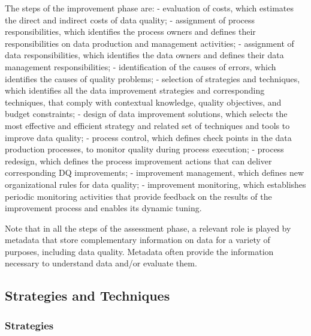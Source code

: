 \documentclass[pdftex,english,oribibl]{llncs}
\begin{document}
    The steps of the improvement phase are:
    - evaluation of costs, which estimates the direct and indirect costs of data quality;
    - assignment of process responsibilities, which identifies the process owners and defines their responsibilities on data production and management activities;
    - assignment of data responsibilities, which identifies the data owners and defines their data management responsibilities;
    - identification of the causes of errors, which identifies the causes of quality problems;
    - selection of strategies and techniques, which identifies all the data improvement strategies and corresponding techniques, that comply with contextual knowledge, quality objectives, and budget constraints;
    - design of data improvement solutions, which selects the most effective and efficient strategy and related set of techniques and tools to improve data quality;
    - process control, which defines check points in the data production processes, to monitor quality during process execution;
    - process redesign, which defines the process improvement actions that can deliver corresponding DQ improvements;
    - improvement management, which defines new organizational rules for data quality;
    - improvement monitoring, which establishes periodic monitoring activities that provide feedback on the results of the improvement process and enables its dynamic tuning.

    Note that in all the steps of the assessment phase, a relevant role is played by metadata that store complementary information on data for a variety of purposes, including data quality. Metadata often provide the information necessary to understand data and/or evaluate them.

    \subsection{Strategies and Techniques}
    \subsubsection{Strategies}

\end{document}
